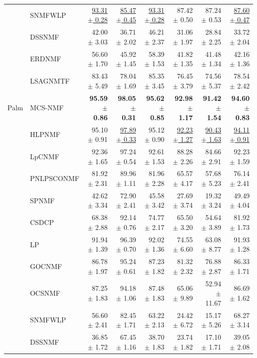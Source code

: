 \begin{landscape}
\begin{longtable}{llrrrrrr}
 & SNMFWLP & \underline{93.31 $\pm$ 0.28} & \underline{85.47 $\pm$ 0.45} & \underline{93.31 $\pm$ 0.28} & 87.42 $\pm$ 0.50 & 87.24 $\pm$ 0.53 & \underline{87.60 $\pm$ 0.47} \\
 & DSSNMF & 42.00 $\pm$ 3.03 & 36.71 $\pm$ 2.02 & 46.21 $\pm$ 2.37 & 31.06 $\pm$ 1.97 & 28.84 $\pm$ 2.25 & 33.72 $\pm$ 2.04 \\
 & ERDNMF & 56.60 $\pm$ 1.70 & 45.92 $\pm$ 1.45 & 58.39 $\pm$ 1.53 & 41.82 $\pm$ 1.35 & 41.48 $\pm$ 1.34 & 42.16 $\pm$ 1.36 \\
 & LSAGNMTF & 83.43 $\pm$ 5.49 & 78.04 $\pm$ 1.69 & 85.35 $\pm$ 3.45 & 76.45 $\pm$ 3.79 & 74.56 $\pm$ 5.37 & 78.54 $\pm$ 2.42 \\
\midrule
Palm & MCS-NMF & \textbf{95.59 $\pm$ 0.86} & \textbf{98.05 $\pm$ 0.31} & \textbf{95.62 $\pm$ 0.85} & \textbf{92.98 $\pm$ 1.17} & \textbf{91.42 $\pm$ 1.54} & \textbf{94.60 $\pm$ 0.83} \\
 & HLPNMF & 95.10 $\pm$ 0.91 & \underline{97.89 $\pm$ 0.33} & 95.12 $\pm$ 0.90 & \underline{92.23 $\pm$ 1.27} & \underline{90.43 $\pm$ 1.63} & \underline{94.11 $\pm$ 0.91} \\
 & LpCNMF & 92.36 $\pm$ 1.65 & 97.24 $\pm$ 0.54 & 92.61 $\pm$ 1.53 & 88.28 $\pm$ 2.26 & 84.66 $\pm$ 2.91 & 92.23 $\pm$ 1.59 \\
 & PNLPSCONMF & 81.92 $\pm$ 2.31 & 89.96 $\pm$ 1.11 & 81.96 $\pm$ 2.28 & 65.57 $\pm$ 4.17 & 57.68 $\pm$ 5.23 & 76.14 $\pm$ 2.41 \\
 & SPNMF & 42.62 $\pm$ 3.34 & 72.90 $\pm$ 2.41 & 45.58 $\pm$ 3.42 & 27.69 $\pm$ 3.74 & 19.32 $\pm$ 3.24 & 49.49 $\pm$ 4.04 \\
 & CSDCP & 68.38 $\pm$ 2.88 & 92.14 $\pm$ 0.76 & 74.77 $\pm$ 2.17 & 65.50 $\pm$ 3.20 & 54.64 $\pm$ 3.89 & 81.92 $\pm$ 1.73 \\
 & LP & 91.94 $\pm$ 1.39 & 96.39 $\pm$ 0.70 & 92.02 $\pm$ 1.36 & 74.55 $\pm$ 6.60 & 63.08 $\pm$ 8.77 & 91.93 $\pm$ 1.28 \\
 & GOCNMF & 86.78 $\pm$ 1.97 & 95.24 $\pm$ 0.61 & 87.23 $\pm$ 1.82 & 81.32 $\pm$ 2.32 & 76.88 $\pm$ 2.87 & 86.33 $\pm$ 1.71 \\
 & OCSNMF & 87.25 $\pm$ 1.83 & 94.18 $\pm$ 1.06 & 87.48 $\pm$ 1.83 & 65.06 $\pm$ 9.89 & 52.94 $\pm$ 11.67 & 86.69 $\pm$ 1.62 \\
 & SNMFWLP & 56.60 $\pm$ 2.41 & 82.45 $\pm$ 1.71 & 63.22 $\pm$ 2.13 & 24.42 $\pm$ 6.72 & 15.17 $\pm$ 5.26 & 68.27 $\pm$ 3.14 \\
 & DSSNMF & 36.85 $\pm$ 1.72 & 67.45 $\pm$ 1.16 & 38.70 $\pm$ 1.83 & 23.74 $\pm$ 1.82 & 17.10 $\pm$ 1.71 & 39.05 $\pm$ 2.08 \\

\end{longtable}
\end{landscape}
